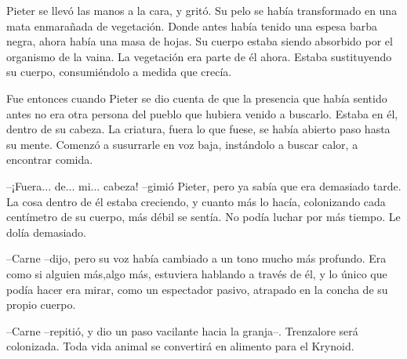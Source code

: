 Pieter se llevó las manos a la cara, y gritó. Su pelo se había transformado en una mata enmarañada de vegetación. Donde antes había tenido una espesa barba negra, ahora había una masa de hojas. Su cuerpo estaba siendo absorbido por el organismo de la vaina. La vegetación era parte de él ahora. Estaba sustituyendo su cuerpo, consumiéndolo a medida que crecía.



Fue entonces cuando Pieter se dio cuenta de que la presencia que había sentido antes no era otra persona del pueblo que hubiera venido a buscarlo. Estaba en él, dentro de su cabeza. La criatura, fuera lo que fuese, se había abierto paso hasta su mente. Comenzó a susurrarle en voz baja, instándolo a buscar calor, a encontrar comida.



--¡Fuera... de... mi... cabeza! --gimió Pieter, pero ya sabía que era demasiado tarde. La cosa dentro de él estaba creciendo, y cuanto más lo hacía, colonizando cada centímetro de su cuerpo, más débil se sentía. No podía luchar por más tiempo. Le dolía demasiado.



--Carne --dijo, pero su voz había cambiado a un tono mucho más profundo. Era como si alguien más,algo más, estuviera hablando a través de él, y lo único que podía hacer era mirar, como un espectador pasivo, atrapado en la concha de su propio cuerpo.



--Carne --repitió, y dio un paso vacilante hacia la granja--. Trenzalore será colonizada. Toda vida animal se convertirá en alimento para el Krynoid.
